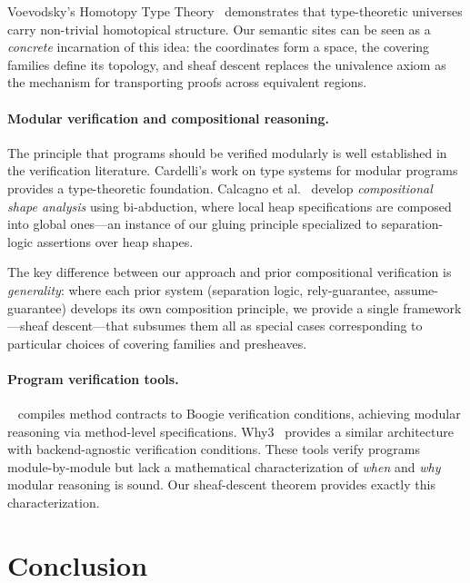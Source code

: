 \documentclass[11pt]{article}
\begin{document}
Voevodsky's Homotopy Type Theory~\cite{Voevodsky2013,HoTTBook}
demonstrates that type-theoretic universes carry non-trivial homotopical
structure.  Our semantic sites can be seen as a \emph{concrete} incarnation
of this idea: the coordinates form a space, the covering families define
its topology, and sheaf descent replaces the univalence axiom as the
mechanism for transporting proofs across equivalent regions.

\paragraph{Modular verification and compositional reasoning.}
The principle that programs should be verified modularly is well established
in the verification literature.  Cardelli's work on type systems for
modular programs~\cite{Cardelli1997} provides a type-theoretic foundation.
Calcagno et al.~\cite{Calcagno2007} develop \emph{compositional shape
analysis} using bi-abduction, where local heap specifications are composed
into global ones---an instance of our gluing principle specialized to
separation-logic assertions over heap shapes.

The key difference between our approach and prior compositional verification
is \emph{generality}: where each prior system (separation logic, rely-guarantee,
assume-guarantee) develops its own composition principle, we provide a single
framework---sheaf descent---that subsumes them all as special cases
corresponding to particular choices of covering families and presheaves.

\paragraph{Program verification tools.}
\Dafny~\cite{Leino2010} compiles method contracts to Boogie verification
conditions, achieving modular reasoning via method-level specifications.
Why3~\cite{Filliatre2013} provides a similar architecture with
backend-agnostic verification conditions.  These tools verify programs
module-by-module but lack a mathematical characterization of \emph{when}
and \emph{why} modular reasoning is sound.  Our sheaf-descent theorem
provides exactly this characterization.

\section{Conclusion}\label{sec:conclusion}
\end{document}
